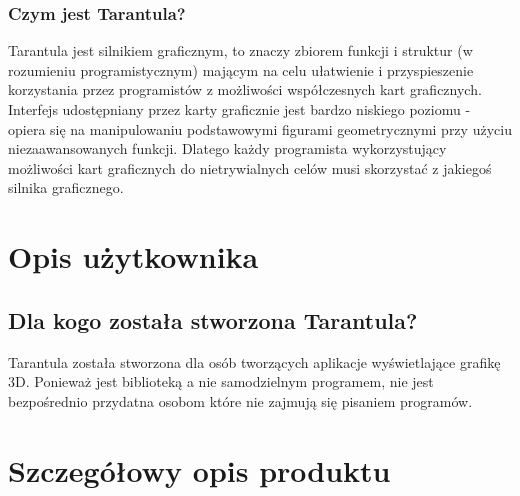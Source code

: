\documentclass[11pt,leqno]{article}
\begin{document}
\subsubsection{Czym jest Tarantula?}
Tarantula jest silnikiem graficznym, to znaczy zbiorem funkcji i struktur (w rozumieniu programistycznym) mającym 
na celu ułatwienie i przyspieszenie korzystania przez programistów z możliwości współczesnych kart graficznych. 
Interfejs udostępniany przez karty graficznie jest bardzo niskiego poziomu - 
opiera się na manipulowaniu podstawowymi figurami geometrycznymi przy użyciu niezaawansowanych funkcji.
Dlatego każdy programista wykorzystujący możliwości kart graficznych do nietrywialnych celów musi skorzystać z jakiegoś silnika graficznego.

\section{Opis użytkownika}
\subsection{Dla kogo została stworzona Tarantula?}

Tarantula została stworzona dla osób tworzących aplikacje wyświetlające grafikę 3D. Ponieważ jest biblioteką a nie samodzielnym programem, 
nie jest bezpośrednio przydatna osobom które nie zajmują się pisaniem programów.

\section{Szczegółowy opis produktu}
\end{document}
